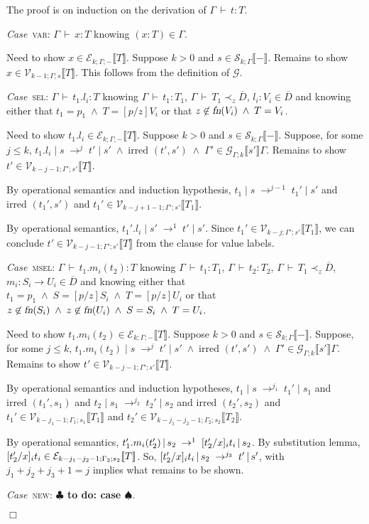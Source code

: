 \documentclass[9pt]{sigplanconf}
\newenvironment{myproof}{{\em Proof:}}{$\Box$}
\newcommand{\Case}{{\em Case\ }}
\newcommand{\ts}{\,\vdash\,}
\newcommand{\fn}{\mbox{\sl fn}}
\newcommand{\expand}{\prec}
\newcommand{\remark}[1]{{\bf $\clubsuit$ #1 $\spadesuit$}}
\newcommand{\todo}[1]{\remark{to do: #1}}
\newcommand{\tfun}{\rightarrow}
\newcommand{\seq}[1]{\overline{#1}}
\newcommand{\subst}[3]{[#1/#2]#3}
\newcommand{\ldecl}[2]{#1 : #2}
\newcommand{\mdecl}[3]{#1 : #2 \tfun #3}
\newcommand{\relv}[4]{\mathcal{V}_{#1;#2;#3}\llbracket#4\rrbracket}
\newcommand{\rele}[4]{\mathcal{E}_{#1;#2;#3}\llbracket#4\rrbracket}
\newcommand{\rels}[3]{\mathcal{S}_{#1;#2}\llbracket#3\rrbracket}
\newcommand{\relg}[3]{\mathcal{G}_{#1;#2}\llbracket#3\rrbracket}
\newcommand{\irred}[2]{\text{irred }(#1,#2)}
\newcommand{\andl}{\;\wedge\;}
\newcommand{\reductionl}[5]{#1 \operatorname{|} #2 \;\rightarrow^{#5}\; #3 \operatorname{|} #4}
\begin{document}
\begin{myproof}
The proof is on induction on the derivation of $\Gamma \ts t : T$.

\Case \textsc{var}: $\Gamma \ts x : T$ knowing $(x : T) \in
\Gamma$.

Need to show $x \in \rele k \Gamma - T$. Suppose $k > 0$ and $s \in
\rels k \Gamma -$. Remains to show $x \in \relv {k-1} \Gamma s
T$. This follows from the definition of $\mathcal{G}$.

\Case \textsc{sel}: $\Gamma \ts t_1.l_i : T$ knowing $\Gamma \ts t_1 :
T_1$, $\Gamma \ts T_1 \expand_z \seq{D}$, $\ldecl {l_i} {V_i} \in
\seq{D}$ and knowing either that $t_1 = p_1 \andl T = \subst p z
    {V_i}$ or that $z \not\in \fn(V_i) \andl T = V_i$.

Need to show $t_1.l_i \in \rele k \Gamma - T$. Suppose $k > 0$ and $s
\in \rels k \Gamma -$. Suppose, for some $j \leq k$, $\reductionl
    {t_1.l_i} s {t'} {s'} j \andl \irred {t'} {s'} \andl \Gamma' \in
    \relg \Gamma k {s'} \Gamma$. Remains to show ${t'} \in \relv
          {k-j-1} {\Gamma'} {s'} T$.

By operational semantics and induction hypothesis, $\reductionl {t_1}
s {t_1'} {s'} {j-1}$ and $\irred {t_1'} {s'}$ and ${t_1'} \in \relv
{k-j+1-1} {\Gamma'} {s'} {T_1}$.

By operational semantics, $\reductionl {t_1'.l_i} {s'} {t'} {s'}
1$. Since ${t_1'} \in \relv {k-j} {\Gamma'} {s'} {T_1}$, we can
conclude $t' \in \relv {k-j-1} {\Gamma'} {s'} T$ from the clause for
value labels.

\Case \textsc{msel}: $\Gamma \ts t_1.m_i(t_2) : T$ knowing $\Gamma \ts
t_1 : T_1$, $\Gamma \ts t_2 : T_2$, $\Gamma \ts T_1 \expand_z
\seq{D}$, $\mdecl {m_i} {S_i} {U_i} \in \seq{D}$ and knowing either
that $t_1 = p_1 \andl S = \subst p z {S_i} \andl T = \subst p z {U_i}$
or that $z \not\in \fn(S_i) \andl z \not\in \fn(U_i) \andl S = S_i \andl
T = U_i$.

Need to show $t_1.m_i(t_2) \in \rele k \Gamma - T$. Suppose $k > 0$
and $s \in \rels k \Gamma -$. Suppose, for some $j \leq k$,
$\reductionl {t_1.m_i(t_2)} s {t'} {s'} j \andl \irred {t'} {s'} \andl
\Gamma' \in \relg \Gamma k {s'} \Gamma$. Remains to show ${t'} \in
\relv {k-j-1} {\Gamma'} {s'} T$.

By operational semantics and induction hypotheses, $\reductionl {t_1}
s {t_1'} {s_1} {j_1}$ and $\irred {t_1'} {s_1}$ and $\reductionl {t_2}
{s_1} {t_2'} {s_2} {j_2}$ and $\irred {t_2'} {s_2}$ and ${t_1'} \in \relv
{k-j_1-1} {\Gamma_1} {s_1} {T_1}$ and ${t_2'} \in \relv {k-j_1-j_2-1}
{\Gamma_2} {s_2} {T_2}$.

By operational semantics, $\reductionl {t_1'.m_i(t_2')} {s_2} {\subst
  {t_2'} x_i t_i} {s_2} 1$. By substitution lemma, ${\subst {t_2'} x_i
  t_i} \in \rele {k-j_1-j_2-1} {\Gamma_2} {s_2} T$. So, $\reductionl
{\subst {t_2'} x_i t_i} {s_2} {t'} {s'} {j_3}$, with $j_1 + j_2 + j_3 +
1 = j$ implies what remains to be shown.

\Case \textsc{new}: \todo{case}.

\end{myproof}
\end{document}
